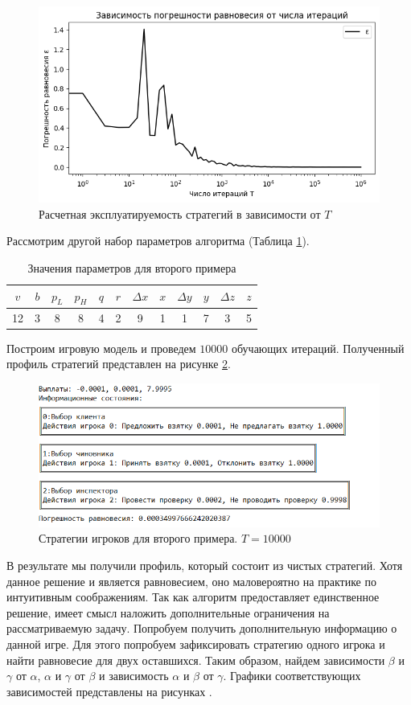 \begin{figure}[H]
	\centering
	\includegraphics[width=0.8\linewidth]{inc/img/c3e1}
	\caption{Расчетная эксплуатируемость стратегий в зависимости от $T$}
	\label{fig:c3e1}
\end{figure}

\par
Рассмотрим другой набор параметров алгоритма (Таблица \ref{tbl:s1_2}).
\begin{table}[H]
	\centering
	\begin{tabular}[t]{|c|c|c|c|c|c|c|c|c|c|c|c|}
		\hline
		$v$ &	$b$ & $p_L$ &	$p_H$ & $q$ & $r$ & $\Delta x$ & $x$ & $\Delta y$ & $y$ & $\Delta z$ & $z$ \\
		\hline
		12 &	3 & 8 &	8 & 4 & 2 & 9 & 1 & 1 & 7 & 3 & 5 \\
		\hline
	\end{tabular}
	\caption{\centering Значения параметров для второго примера}
	\label{tbl:s1_2}
\end{table}
\par
Построим игровую модель и проведем $10000$ обучающих итераций. Полученный профиль стратегий представлен на рисунке \ref{fig:c3th21}.
\begin{figure}[H]
	\centering
	\includegraphics[width=0.8\linewidth]{inc/img/c3th21}
	\caption{Стратегии игроков для второго примера. $T=10000$}
	\label{fig:c3th21}
\end{figure}
\par
В результате мы получили профиль, который состоит из чистых стратегий. Хотя данное решение и является равновесием, оно маловероятно на практике по интуитивным соображениям. Так как алгоритм предоставляет единственное решение, имеет смысл наложить дополнительные ограничения на рассматриваемую задачу. Попробуем получить дополнительную информацию о данной игре. Для этого попробуем зафиксировать стратегию одного игрока и найти равновесие для двух оставшихся. Таким образом, найдем зависимости $\beta$ и $\gamma$ от $\alpha$, $\alpha$ и $\gamma$ от $\beta$ и зависимость $\alpha$ и $\beta$ от $\gamma$. Графики соответствующих зависимостей представлены на рисунках .

